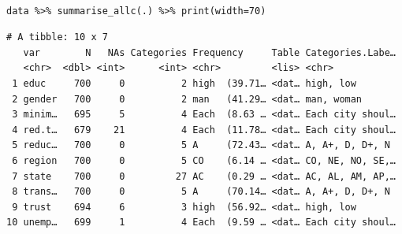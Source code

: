 \documentclass[a4paper]{article}
\begin{document}
\begin{table}[H]
\centering
{}
\end{table}


\lstset{numbers=left,language=r,label= ,caption= ,captionpos=b}
\begin{lstlisting}

data %>% summarise_allc(.) %>% print(width=70)

\end{lstlisting}

\begin{verbatim}
# A tibble: 10 x 7
   var        N   NAs Categories Frequency     Table Categories.Labe…
   <chr>  <dbl> <int>      <int> <chr>         <lis> <chr>           
 1 educ     700     0          2 high  (39.71… <dat… high, low       
 2 gender   700     0          2 man   (41.29… <dat… man, woman      
 3 minim…   695     5          4 Each  (8.63 … <dat… Each city shoul…
 4 red.t…   679    21          4 Each  (11.78… <dat… Each city shoul…
 5 reduc…   700     0          5 A     (72.43… <dat… A, A+, D, D+, N 
 6 region   700     0          5 CO    (6.14 … <dat… CO, NE, NO, SE,…
 7 state    700     0         27 AC    (0.29 … <dat… AC, AL, AM, AP,…
 8 trans…   700     0          5 A     (70.14… <dat… A, A+, D, D+, N 
 9 trust    694     6          3 high  (56.92… <dat… high, low       
10 unemp…   699     1          4 Each  (9.59 … <dat… Each city shoul…
\end{verbatim}
\end{document}
